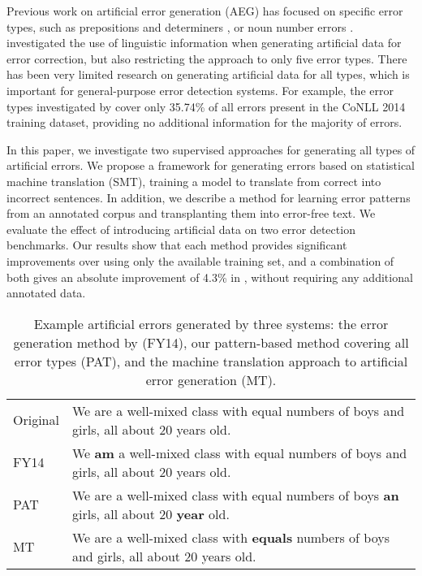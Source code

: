 \documentclass[11pt,letterpaper]{article}
\begin{document}
Previous work on artificial error generation (AEG) has focused on specific error types, such as prepositions and determiners \cite{Rozovskaya2010a,Rozovskaya2011a}, or noun number errors \cite{Brockett2006}.
 investigated the use of linguistic information when generating artificial data for error correction, but also restricting the approach to only five error types. 
There has been very limited research on generating artificial data for all types, which is important for general-purpose error detection systems.
For example, the error types investigated by  cover only 35.74\% of all errors present in the CoNLL 2014 training dataset, providing no additional information for the majority of errors.

In this paper, we investigate two supervised approaches for generating all types of artificial errors.
We propose a framework for generating errors based on statistical machine translation (SMT), training a model to translate from correct into incorrect sentences. In addition, we describe a method for learning error patterns from an annotated corpus and transplanting them into error-free text. We evaluate the effect of introducing artificial data on two error detection benchmarks.
Our results show that each method provides significant improvements over using only the available training set, and a combination of both gives an absolute improvement of 4.3\% in , without requiring any additional annotated data.





\begin{table*}[t]
\setlength\tabcolsep{7pt}
\begin{tabular}{l|l} \hline
\normalsize
Original & We are a well-mixed class with equal numbers of boys and girls, all about 20 years old. \\
FY14 & We \textbf{am} a well-mixed class with equal numbers of boys and girls, all about 20 years old. \\
PAT & We are a well-mixed class with equal numbers of boys \textbf{an} girls, all about 20 \textbf{year} old. \\
MT & We are a well-mixed class with \textbf{equals} numbers of boys and girls, all about 20 years old. \\





\hline
\end{tabular}
\caption{Example artificial errors generated by three systems: the error generation method by  (FY14), our pattern-based method covering all error types (PAT), and the machine translation approach to artificial error generation (MT).}
\label{tab:examples}
\end{table*}
\end{document}
